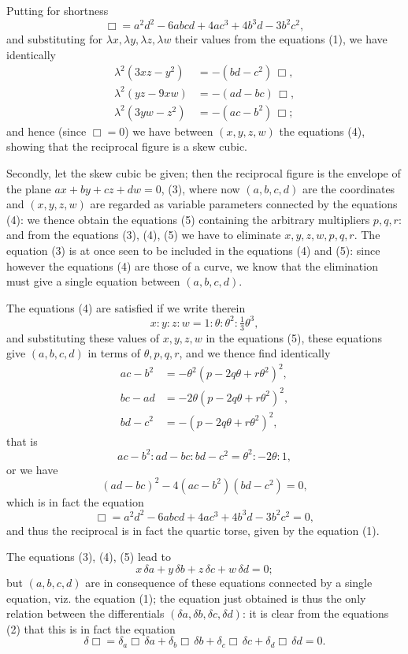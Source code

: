 \documentclass[11pt]{article}
\begin{document}
Putting for shortness
\[ \Box = a^2 d^2 - 6abcd + 4ac^3 + 4b^3 d - 3b^2 c^2, \]
and substituting for $\lambda x, \lambda y, \lambda z, \lambda w$ their values from the equations (1), we have identically
\begin{align*}
\lambda^2(3xz - y^2) &= -(bd - c^2)\,\Box,\\
\lambda^2(yz - 9xw) &= -(ad - bc)\,\Box,\\
\lambda^2(3yw - z^2) &= -(ac - b^2)\,\Box;
\end{align*}
and hence (since $\Box = 0$) we have between $(x,y,z,w)$ the equations (4), showing that the reciprocal figure is a skew cubic.

Secondly, let the skew cubic be given; then the reciprocal figure is the envelope of the plane $ax + by + cz + dw = 0$, (3), where now $(a,b,c,d)$ are the coordinates and $(x,y,z,w)$ are regarded as variable parameters connected by the equations (4): we thence obtain the equations (5) containing the arbitrary multipliers $p,q,r$: and from the equations (3), (4), (5) we have to eliminate $x,y,z,w,p,q,r$. The equation (3) is at once seen to be included in the equations (4) and (5): since however the equations (4) are those of a curve, we know that the elimination must give a single equation between $(a,b,c,d)$.

The equations (4) are satisfied if we write therein
\[ x : y : z : w = 1 : \theta : \theta^2 : \tfrac{1}{3}\theta^3, \]
and substituting these values of $x,y,z,w$ in the equations (5), these equations give $(a,b,c,d)$ in terms of $\theta,p,q,r$, and we thence find identically
\begin{align*}
ac - b^2 &= -\theta^2(p - 2q\theta + r\theta^2)^2,\\
bc - ad &= -2\theta(p - 2q\theta + r\theta^2)^2,\\
bd - c^2 &= -(p - 2q\theta + r\theta^2)^2,
\end{align*}
that is
\[ ac - b^2 : ad - bc : bd - c^2 = \theta^2 : -2\theta : 1, \]
or we have
\[ (ad - bc)^2 - 4(ac - b^2)(bd - c^2) = 0, \]
which is in fact the equation
\begin{equation}
\Box = a^2 d^2 - 6abcd + 4ac^3 + 4b^3 d - 3b^2 c^2 = 0,\tag{1}
\end{equation}
and thus the reciprocal is in fact the quartic torse, given by the equation (1).

The equations (3), (4), (5) lead to
\[ x\,\delta a + y\,\delta b + z\,\delta c + w\,\delta d = 0; \]
but $(a,b,c,d)$ are in consequence of these equations connected by a single equation, viz. the equation (1); the equation just obtained is thus the only relation between the differentials $(\delta a, \delta b, \delta c, \delta d)$: it is clear from the equations (2) that this is in fact the equation
\[ \delta\Box = \delta_a\Box\,\delta a + \delta_b\Box\,\delta b + \delta_c\Box\,\delta c + \delta_d\Box\,\delta d = 0. \]
\end{document}
